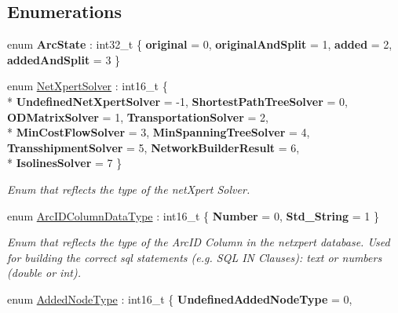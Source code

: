 \subsection*{Enumerations}
\begin{DoxyCompactItemize}
\item 
enum {\bfseries Arc\+State} \+: int32\+\_\+t \{ {\bfseries original} = 0, 
{\bfseries original\+And\+Split} = 1, 
{\bfseries added} = 2, 
{\bfseries added\+And\+Split} = 3
 \}\hypertarget{namespacenetxpert_1_1data_abe820d2337ded6846999a252086882f6}{}\label{namespacenetxpert_1_1data_abe820d2337ded6846999a252086882f6}

\item 
enum \hyperlink{namespacenetxpert_1_1data_a923ee7cb7eab8b9dbfd62fb6d26f51cb}{Net\+Xpert\+Solver} \+: int16\+\_\+t \{ \\*
{\bfseries Undefined\+Net\+Xpert\+Solver} = -\/1, 
{\bfseries Shortest\+Path\+Tree\+Solver} = 0, 
{\bfseries O\+D\+Matrix\+Solver} = 1, 
{\bfseries Transportation\+Solver} = 2, 
\\*
{\bfseries Min\+Cost\+Flow\+Solver} = 3, 
{\bfseries Min\+Spanning\+Tree\+Solver} = 4, 
{\bfseries Transshipment\+Solver} = 5, 
{\bfseries Network\+Builder\+Result} = 6, 
\\*
{\bfseries Isolines\+Solver} = 7
 \}\hypertarget{namespacenetxpert_1_1data_a923ee7cb7eab8b9dbfd62fb6d26f51cb}{}\label{namespacenetxpert_1_1data_a923ee7cb7eab8b9dbfd62fb6d26f51cb}
\begin{DoxyCompactList}\small\item\em Enum that reflects the type of the net\+Xpert Solver. \end{DoxyCompactList}
\item 
enum \hyperlink{namespacenetxpert_1_1data_a7f0e5c814a8a55ea94f348b10826e206}{Arc\+I\+D\+Column\+Data\+Type} \+: int16\+\_\+t \{ {\bfseries Number} = 0, 
{\bfseries Std\+\_\+\+String} = 1
 \}\hypertarget{namespacenetxpert_1_1data_a7f0e5c814a8a55ea94f348b10826e206}{}\label{namespacenetxpert_1_1data_a7f0e5c814a8a55ea94f348b10826e206}
\begin{DoxyCompactList}\small\item\em Enum that reflects the type of the Arc\+ID Column in the netxpert database. Used for building the correct sql statements (e.\+g. S\+QL IN Clauses)\+: text or numbers (double or int). \end{DoxyCompactList}
\item 
enum \hyperlink{namespacenetxpert_1_1data_addf98eb51735356977db0de627cc38c1}{Added\+Node\+Type} \+: int16\+\_\+t \{ {\bfseries Undefined\+Added\+Node\+Type} = 0, 

\end{DoxyCompactItemize}
